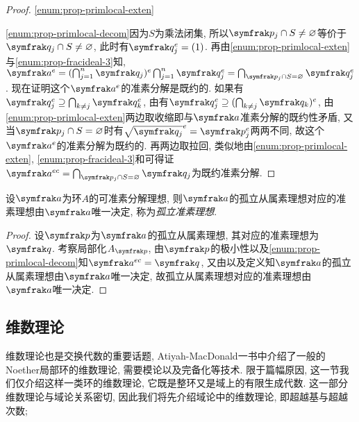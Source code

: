 \begin{proof}
    \ref{enum:prop-primlocal-exten}%

    \ref{enum:prop-primlocal-decom}因为$S$为乘法闭集, 所以$\ideal{p}_j\cap S\neq\varnothing$等价于$\ideal{q}_j\cap S\neq\varnothing$, 此时有$\ideal{q}_j^e=(1)$. 再由\ref{enum:prop-primlocal-exten}与\ref{enum:prop-fracideal-3}知, $\ideal{a}^e=(\bigcap_{j=1}^n\ideal{q}_j)^e\bigcap_{j=1}^n\ideal{q}_j^e=\bigcap_{\ideal{p}_j\cap S=\varnothing}\ideal{q}_j^e$. 现在证明这个$\ideal{a}^e$的准素分解是既约的. 如果有$\ideal{q}_j^e\supseteq\bigcap_{k\neq j}\ideal{q}_k^e$, 由有$\ideal{q}_j^e\supseteq(\bigcap_{k\neq j}\ideal{q}_k)^e$, 由\ref{enum:prop-primlocal-exten}两边取收缩即与$\ideal{a}$准素分解的既约性矛盾, 又当$\ideal{p}_j\cap S=\varnothing$时有$\sqrt{\ideal{q}_j}^e=\ideal{p}_j^e$两两不同, 故这个$\ideal{a}^e$的准素分解为既约的. 再两边取拉回, 类似地由\ref{enum:prop-primlocal-exten}, \ref{enum:prop-fracideal-3}和可得证$\ideal{a}^{ec}=\bigcap_{\ideal{p}_j\cap S=\varnothing}\ideal{q}_j$为既约准素分解.
\end{proof}

\begin{theorem}
    设$\ideal{a}$为环$A$的可准素分解理想, 则$\ideal{a}$的孤立从属素理想对应的准素理想由$\ideal{a}$唯一决定, 称为\emph{孤立准素理想}.
\end{theorem}

\begin{proof}
    设$\ideal{p}$为$\ideal{a}$的孤立从属素理想, 其对应的准素理想为$\ideal{q}$. 考察局部化$A_{\ideal{p}}$, 由$\ideal{p}$的极小性以及\ref{enum:prop-primlocal-decom}知$\ideal{a}^{ec}=\ideal{q}$, 又由以及定义知$\ideal{a}$的孤立从属素理想由$\ideal{a}$唯一决定, 故孤立从属素理想对应的准素理想由$\ideal{a}$唯一决定.
\end{proof}

\subsection{维数理论}

维数理论也是交换代数的重要话题, Atiyah-MacDonald\parencite[116--126, Chapter 11]{atiyah_introduction_1969}一书中介绍了一般的Noether局部环的维数理论, 需要模论以及完备化等技术. 限于篇幅原因, 这一节我们仅介绍这样一类环的维数理论, 它既是整环又是域上的有限生成代数. 这一部分维数理论与域论关系密切, 因此我们将先介绍域论中的维数理论, 即超越基与超越次数;%


